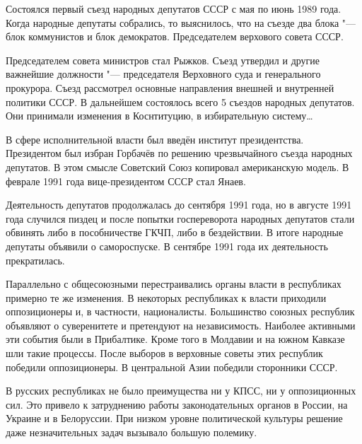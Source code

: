     Состоялся первый съезд народных депутатов СССР с мая по июнь 1989 года. Когда народные депутаты собрались, то выяснилось, что на  съезде два блока "--- блок коммунистов и блок демократов. Председателем верхового совета СССР.
    
    Председателем совета министров стал Рыжков. Съезд утвердил и другие важнейшие должности "--- председателя Верховного суда и генерального прокурора. Съезд рассмотрел основные направления внешней и внутренней политики СССР. В дальнейшем состоялось всего 5 съездов народных депутатов. Они принимали изменения в Коснтитуцию, в избирательную систему\dots
    
    В сфере исполнительной власти был введён институт президентства. Президентом был избран Горбачёв по решению чрезвычайного съезда народных депутатов. В этом смысле Советский Союз копировал американскую модель. В феврале 1991 года вице-президентом СССР стал Янаев.
    
    Деятельность депутатов продолжалась до сентября 1991 года, но в августе 1991 года случился пиздец и после попытки госпереворота народных депутатов стали обвинять либо в пособничестве ГКЧП, либо в бездействии. В итоге народные депутаты объявили о самороспуске. В сентябре 1991 года их деятельность прекратилась.
    
    Параллельно с общесоюзными перестраивались органы власти в республиках примерно те же изменения. В некоторых республиках к власти приходили оппозиционеры и, в частности, националисты. Большинство союзных республик объявляют о суверенитете и претендуют на независимость. Наиболее активными эти события были в Прибалтике. Кроме того в Молдавии и на южном Кавказе шли такие процессы. После выборов в верховные советы этих республик победили оппозиционеры. В центральной Азии победили сторонники СССР.
    
    В русских республиках не было преимущества ни у КПСС, ни у оппозиционных сил. Это привело к затруднению работы законодательных органов в России, на Украине и в Белоруссии. При низком уровне политической культуры решение даже незначительных задач вызывало большую полемику.
    
